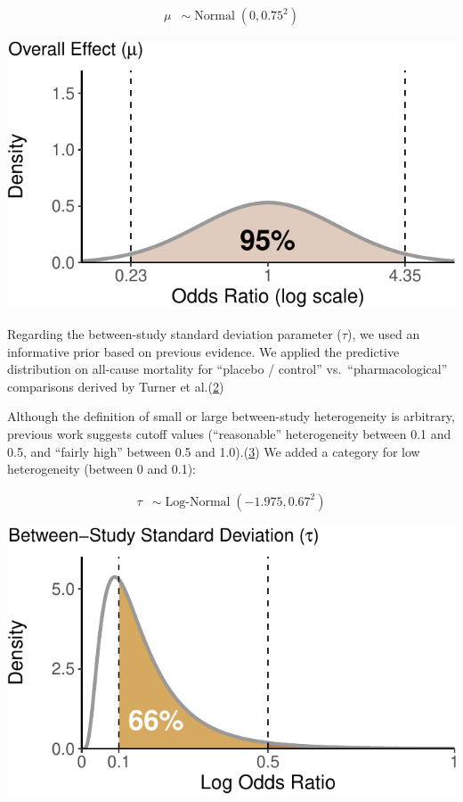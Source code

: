 \documentclass[
  12pt,
]{article}
\begin{document}
\begin{align*}
\mu & \sim \operatorname{Normal}(0, 0.75^2)
\end{align*}

\begin{center}\includegraphics{supplementary_material_files/figure-latex/mu prior visualization-1} \end{center}

\newpage

Regarding the between-study standard deviation parameter (\(\tau\)), we
used an informative prior based on previous evidence. We applied the
predictive distribution on all-cause mortality for ``placebo / control''
vs.~``pharmacological'' comparisons derived by Turner et
al.(\protect\hyperlink{ref-turner2015}{2})

Although the definition of small or large between-study heterogeneity is
arbitrary, previous work suggests cutoff values (``reasonable''
heterogeneity between 0.1 and 0.5, and ``fairly high'' between 0.5 and
1.0).(\protect\hyperlink{ref-spiegelhalter2004}{3}) We added a category
for low heterogeneity (between 0 and 0.1):

\begin{align*}
\tau & \sim \operatorname{Log-Normal}(-1.975, 0.67^2)
\end{align*}

\begin{center}\includegraphics{supplementary_material_files/figure-latex/informative tau prior visualization-1} \end{center}
\end{document}
